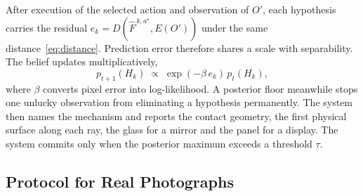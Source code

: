 \documentclass{article} %
\theoremstyle{defstyle}
\theoremstyle{plain}
\begin{document}
After execution of the selected action and observation of $O'$, each hypothesis carries the
residual $e_k = D(\hat{F}^{\,k,a^\star}, E(O'))$ under the same distance~\eqref{eq:distance}.
Prediction error therefore shares a scale with separability. The belief updates
multiplicatively,
\begin{equation}
\label{eq:belief}
p_{t+1}(H_k) \;\propto\; \exp\!\left(-\beta\, e_k\right)\, p_t(H_k),
\end{equation}
where $\beta$ converts pixel error into log-likelihood. A posterior floor meanwhile stops one
unlucky observation from eliminating a hypothesis permanently. The system then names the
mechanism and reports the contact geometry, the first physical surface along each ray, the
glass for a mirror and the panel for a display. The system commits only when the posterior maximum exceeds a threshold $\tau$.

\subsection{Protocol for Real Photographs}
\label{sec:real-protocol}
\end{document}
